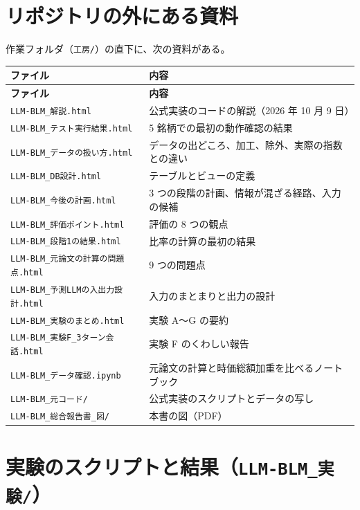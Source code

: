 \documentclass[xelatex,ja=standard,jafont=hiragino-pron,a4paper,10pt]{bxjsreport}
\newcommand{\code}[1]{\texttt{#1}}
\begin{document}
\section{リポジトリの外にある資料}

作業フォルダ（\code{工房/}）の直下に、次の資料がある。

\begin{longtable}{p{6.40cm}p{8.00cm}}
\toprule
\textbf{ファイル} & \textbf{内容} \\
\midrule
\endfirsthead
\toprule
\textbf{ファイル} & \textbf{内容} \\
\midrule
\endhead
\bottomrule
\endfoot
\code{LLM-BLM\_解説.html} & 公式実装のコードの解説（2026 年 10 月 9 日） \\
\code{LLM-BLM\_テスト実行結果.html} & 5 銘柄での最初の動作確認の結果 \\
\code{LLM-BLM\_データの扱い方.html} & データの出どころ、加工、除外、実際の指数との違い \\
\code{LLM-BLM\_DB設計.html} & テーブルとビューの定義 \\
\code{LLM-BLM\_今後の計画.html} & 3 つの段階の計画、情報が混ざる経路、入力の候補 \\
\code{LLM-BLM\_評価ポイント.html} & 評価の 8 つの観点 \\
\code{LLM-BLM\_段階1の結果.html} & 比率の計算の最初の結果 \\
\code{LLM-BLM\_元論文の計算の問題点.html} & 9 つの問題点 \\
\code{LLM-BLM\_予測LLMの入出力設計.html} & 入力のまとまりと出力の設計 \\
\code{LLM-BLM\_実験のまとめ.html} & 実験 A〜G の要約 \\
\code{LLM-BLM\_実験F\_3ターン会話.html} & 実験 F のくわしい報告 \\
\code{LLM-BLM\_データ確認.ipynb} & 元論文の計算と時価総額加重を比べるノートブック \\
\code{LLM-BLM\_元コード/} & 公式実装のスクリプトとデータの写し \\
\code{LLM-BLM\_総合報告書\_図/} & 本書の図（PDF） \\
\end{longtable}

\section{実験のスクリプトと結果（\code{LLM-BLM\_実験/}）}
\end{document}
